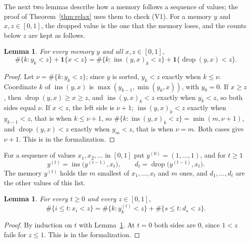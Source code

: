 \documentclass[11pt]{amsart}
\newtheorem{lemma}[theorem]{Lemma}
\theoremstyle{definition}
\numberwithin{equation}{section}
\newcommand{\lean}[1]{\ignorespaces}
\newcommand{\ins}{\operatorname{ins}}
\newcommand{\drop}{\operatorname{drop}}
\newcommand{\one}{\mathbf{1}}
\begin{document}
The next two lemmas describe how a memory follows a sequence of values; the proof of Theorem~\ref{thm:relax} uses them to check (V1). For a memory $y$ and $x,z\in[0,1]$, the dropped value is the one that the memory loses, and the counts below $z$ are kept as follows.

\begin{lemma}\label{lem:count}\lean{Robbins.card_lt_add_ite}
For every memory $y$ and all $x,z\in[0,1]$,
\[
\#\{k: y_k<z\}+\one\{x<z\}=\#\{k:\ins(y,x)_k<z\}+\one\{\drop(y,x)<z\}.
\]
\end{lemma}

\begin{proof}
Let $\nu=\#\{k:y_k<z\}$; since $y$ is sorted, $y_k<z$ exactly when $k\le \nu$. Coordinate $k$ of $\ins(y,x)$ is $\max(y_{k-1},\min(y_k,x))$, with $y_0=0$. If $x\ge z$, then $\drop(y,x)\ge x\ge z$, and $\ins(y,x)_k<z$ exactly when $y_k<z$, so both sides equal $\nu$. If $x<z$, the left side is $\nu+1$; $\ins(y,x)_k<z$ exactly when $y_{k-1}<z$, that is when $k\le \nu+1$, so $\#\{k:\ins(y,x)_k<z\}=\min(m,\nu+1)$, and $\drop(y,x)<z$ exactly when $y_m<z$, that is when $\nu=m$. Both cases give $\nu+1$. This is  in the formalization.
\end{proof}

For a sequence of values $x_1,x_2,\dots$ in $[0,1]$ put $y^{(0)}=(1,\dots,1)$, and for $t\ge1$
\[
y^{(t)}=\ins\bigl(y^{(t-1)},x_t\bigr),\qquad d_t=\drop\bigl(y^{(t-1)},x_t\bigr).
\]
The memory $y^{(t)}$ holds the $m$ smallest of $x_1,\dots,x_t$ and $m$ ones, and $d_1,\dots,d_t$ are the other values of this list.

\begin{lemma}\label{lem:traj}\lean{Robbins.card_traj}
For every $t\ge0$ and every $z\in[0,1]$,
\[
\#\{i\le t: x_i<z\}=\#\{k: y^{(t)}_k<z\}+\#\{s\le t: d_s<z\}.
\]
\end{lemma}

\begin{proof}
By induction on $t$ with Lemma~\ref{lem:count}. At $t=0$ both sides are $0$, since $1<z$ fails for $z\le1$. This is  in the formalization.
\end{proof}
\end{document}
